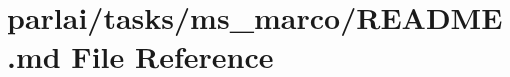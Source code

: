\hypertarget{parlai_2tasks_2ms__marco_2README_8md}{}\section{parlai/tasks/ms\+\_\+marco/\+R\+E\+A\+D\+ME.md File Reference}
\label{parlai_2tasks_2ms__marco_2README_8md}

